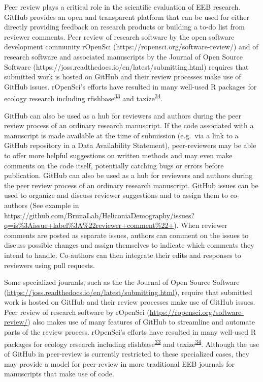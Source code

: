 Peer review plays a critical role in the scientific evaluation of EEB research.
GitHub provides an open and transparent platform that can be used for either directly providing feedback on research products or building a to-do list from reviewer comments.
Peer review of research software by the open software development community rOpenSci (https://ropensci.org/software-review/) and of research software and associated manuscripts by the Journal of Open Source Software (https://joss.readthedocs.io/en/latest/submitting.html) requires that submitted work is hosted on GitHub and their review processes make use of GitHub issues.
rOpenSci's efforts have resulted in many well-used R packages for ecology research including rfishbase\textsuperscript{\protect\hyperlink{ref-Xsdcv6q}{33}} and taxize\textsuperscript{\protect\hyperlink{ref-FVBWKkZu}{34}}.

GitHub can also be used as a hub for reviewers and authors during the peer review process of an ordinary research manuscript.
If the code associated with a manuscript is made available at the time of submission (e.g.~via a link to a GitHub repository in a Data Availability Statement), peer-reviewers may be able to offer more helpful suggestions on written methods and may even make comments on the code itself, potentially catching bugs or errors before publication.
GitHub can also be used as a hub for reviewers and authors during the peer review process of an ordinary research manuscript.
GitHub issues can be used to organize and discuss reviewer suggestions and to assign them to co-authors (See example in \url{https://github.com/BrunaLab/HeliconiaDemography/issues?q=is\%3Aissue+label\%3A\%22reviewer+comment\%22+}).
When reviewer comments are posted as separate issues, authors can comment on the issues to discuss possible changes and assign themselves to indicate which comments they intend to handle.
Co-authors can then integrate their edits and responses to reviewers using pull requests.

Some specialized journals, such as the the Journal of Open Source Software (\url{https://joss.readthedocs.io/en/latest/submitting.html}), require that submitted work is hosted on GitHub and their review processes make use of GitHub issues.
Peer review of research software by rOpenSci (\url{https://ropensci.org/software-review/}) also makes use of many features of GitHub to streamline and automate parts of the review process.
rOpenSci's efforts have resulted in many well-used R packages for ecology research including rfishbase\textsuperscript{\protect\hyperlink{ref-Xsdcv6q}{33}} and taxize\textsuperscript{\protect\hyperlink{ref-FVBWKkZu}{34}}.
Although the use of GitHub in peer-review is currently restricted to these specialized cases, they may provide a model for peer-review in more traditional EEB journals for manuscripts that make use of code.

